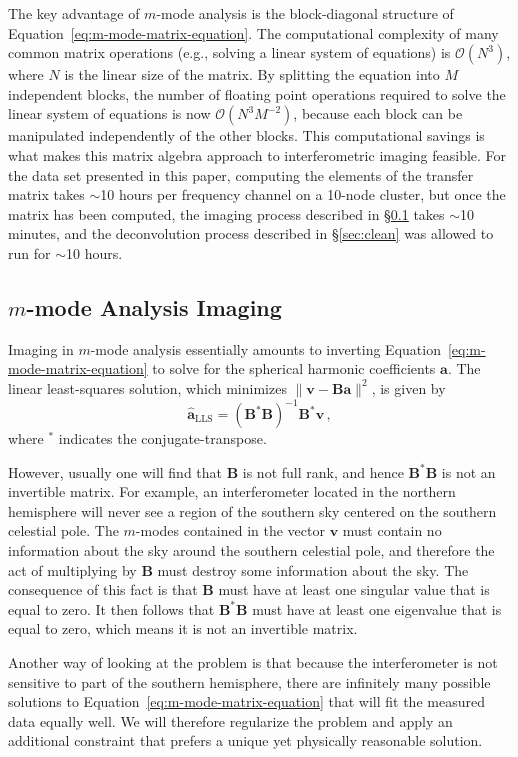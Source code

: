 \documentclass[twocolumn]{aastex61}
\renewcommand{\b}{\pmb}
\begin{document}
The key advantage of $m$-mode analysis is the block-diagonal structure of
Equation~\ref{eq:m-mode-matrix-equation}. The computational complexity of many common matrix
operations (e.g., solving a linear system of equations) is $\mathcal{O}(N^3)$, where $N$ is the
linear size of the matrix.  By splitting the equation into $M$ independent blocks, the number of
floating point operations required to solve the linear system of equations is now
$\mathcal{O}(N^3M^{-2})$, because each block can be manipulated independently of the other blocks.
This computational savings is what makes this matrix algebra approach to interferometric imaging
feasible. For the data set presented in this paper, computing the elements of the transfer matrix
takes $\sim$10 hours per frequency channel on a 10-node cluster, but once the matrix has been
computed, the imaging process described in \S\ref{sec:mmode-imaging} takes $\sim$10 minutes, and the
deconvolution process described in \S\ref{sec:clean} was allowed to run for $\sim$10 hours.

\subsection{$m$-mode Analysis Imaging}\label{sec:mmode-imaging}

Imaging in $m$-mode analysis essentially amounts to inverting
Equation~\ref{eq:m-mode-matrix-equation} to solve for the spherical harmonic coefficients $\b a$.
The linear least-squares solution, which minimizes $\|\b v - \b B\b a\|^2$, is given by
\begin{equation}
    \b{\hat a}_\text{LLS} = (\b B^*\b B)^{-1}\b B^*\b v\,,
\end{equation}
where $^*$ indicates the conjugate-transpose.

However, usually one will find that $\b B$ is not full rank, and hence $\b B^*\b B$ is not an
invertible matrix. For example, an interferometer located in the northern hemisphere will never see
a region of the southern sky centered on the southern celestial pole. The $m$-modes contained in the
vector $\b v$ must contain no information about the sky around the southern celestial pole, and
therefore the act of multiplying by $\b B$ must destroy some information about the sky. The
consequence of this fact is that $\b B$ must have at least one singular value that is equal to zero.
It then follows that $\b B^*\b B$ must have at least one eigenvalue that is equal to zero, which
means it is not an invertible matrix.

Another way of looking at the problem is that because the interferometer is not sensitive to part of
the southern hemisphere, there are infinitely many possible solutions to
Equation~\ref{eq:m-mode-matrix-equation} that will fit the measured data equally well.  We will
therefore regularize the problem and apply an additional constraint that prefers a unique yet
physically reasonable solution.
\end{document}
